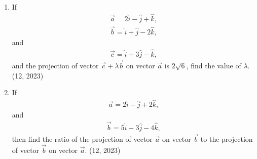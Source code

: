 \begin{enumerate}[label=\thesubsection.\arabic*, ref=\thesubsection.\theenumi]
    \item If
    \begin{align}
        \overrightarrow{a} = 2\hat{i} - \hat{j} + \hat{k},
    \end{align}
    \begin{align}
        \overrightarrow{b} = \hat{i} + \hat{j} - 2\hat{k},
    \end{align}
    and
    \begin{align}
        \overrightarrow{c} = \hat{i} + 3\hat{j} - \hat{k},
    \end{align}
    and the projection of vector $\overrightarrow{c} + \lambda \overrightarrow{b}$ on vector $\overrightarrow{a}$ is $2\sqrt{6}$, find the value of $\lambda$.
    \hfill (12, 2023)
    \item If
    \begin{align}
        \overrightarrow{a} = 2\hat{i} - \hat{j} + 2\hat{k},
    \end{align}
    and
    \begin{align}
        \overrightarrow{b} = 5\hat{i} - 3\hat{j} - 4\hat{k},
    \end{align}
    then find the ratio of the projection of vector $\overrightarrow{a}$ on vector $\overrightarrow{b}$ to the projection of vector $\overrightarrow{b}$ on vector $\overrightarrow{a}$.
    \hfill (12, 2023)


\end{enumerate}
